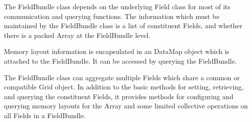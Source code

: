 


The FieldBundle class depends on the underlying Field class for most of its
communication and querying functions.  The information which
must be maintained by the FieldBundle class is a list of constituent
Fields, and whether there is a packed Array at the FieldBundle level.

Memory layout information is encapsulated in an DataMap object which
is attached to the FieldBundle.  It can be accessed by querying the FieldBundle.

The FieldBundle class can aggregate multiple Fields which share a
common or compatible Grid object.  In addition to the basic methods for
setting, retrieving, and querying the constituent Fields, it provides
methods for configuring and querying memory layouts for the Array
and some limited collective operations on all Fields in a FieldBundle.


